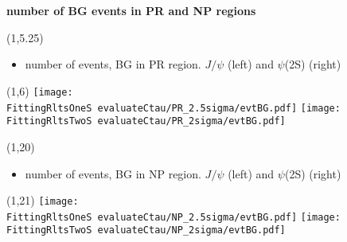 \documentclass[11pt,slidescentered,red,compress,handout,hyperref={bookmarks=true},mathseriftable]{beamer}
\newcommand{\FittingRltsOneS}{../Psi1S/Fit/parameter/}
\newcommand{\FittingRltsTwoS}{../Psi2S/Fit/parameter/}
\begin{document}
\section{}
\begin{frame}[t]{\small \bf number of BG events in PR and NP regions}{}
\begin{textblock}{48}(1,5.25)
\begin{itemize}
\scriptsize \item number of events, BG in PR region. $J/\psi$ (left) and $\psi$(2S) (right)
\end{itemize}
\end{textblock}
\begin{textblock}{48}(1,6)
\hspace*{10pt} \texttt{[image: \\FittingRltsOneS evaluateCtau/PR\_2.5sigma/evtBG.pdf]}
\hspace*{10pt} \texttt{[image: \\FittingRltsTwoS evaluateCtau/PR\_2sigma/evtBG.pdf]}
\end{textblock}

\begin{textblock}{48}(1,20)
\begin{itemize}
\scriptsize \item  number of events, BG in NP region. $J/\psi$ (left) and $\psi$(2S) (right)
\end{itemize}
\end{textblock}
\begin{textblock}{48}(1,21)
\hspace*{10pt} \texttt{[image: \\FittingRltsOneS evaluateCtau/NP\_2.5sigma/evtBG.pdf]}
\hspace*{10pt} \texttt{[image: \\FittingRltsTwoS evaluateCtau/NP\_2sigma/evtBG.pdf]}
\end{textblock}

\end{frame}
\end{document}
